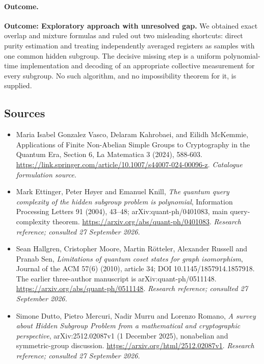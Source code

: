\documentclass[11pt,a4paper]{article}
\numberwithin{equation}{section}
\begin{document}
\paragraph{Outcome.}
\textbf{Outcome: Exploratory approach with unresolved gap.}
We obtained exact overlap and mixture formulas and ruled out two misleading shortcuts: direct purity estimation and treating independently averaged registers as samples with one common hidden subgroup. The decisive missing step is a uniform polynomial-time implementation and decoding of an appropriate collective measurement for every subgroup. No such algorithm, and no impossibility theorem for it, is supplied.

\subsection{Sources}
\begin{itemize}\raggedright
\item[\textnormal{[S1]}]\hypertarget{source:30006778:1}{} Maria Isabel Gonzalez Vasco, Delaram Kahrobaei, and Eilidh McKemmie, Applications of Finite Non-Abelian Simple Groups to Cryptography in the Quantum Era, Section 6, La Matematica 3 (2024), 588-603.
\url{https://link.springer.com/article/10.1007/s44007-024-00096-z}.
{\small\textit{Catalogue formulation source.}}
\item[\textnormal{[E1]}]\hypertarget{extra:30006778:1}{} Mark Ettinger, Peter H\o yer and Emanuel Knill, \emph{The quantum query complexity of the hidden subgroup problem is polynomial}, Information Processing Letters 91 (2004), 43--48; arXiv:quant-ph/0401083, main query-complexity theorem.
\url{https://arxiv.org/abs/quant-ph/0401083}.
{\small\textit{Research reference; consulted 27 September 2026.}}
\item[\textnormal{[E2]}]\hypertarget{extra:30006778:2}{} Sean Hallgren, Cristopher Moore, Martin R\"otteler, Alexander Russell and Pranab Sen, \emph{Limitations of quantum coset states for graph isomorphism}, Journal of the ACM 57(6) (2010), article 34; DOI 10.1145/1857914.1857918. The earlier three-author manuscript is arXiv:quant-ph/0511148.
\url{https://arxiv.org/abs/quant-ph/0511148}.
{\small\textit{Research reference; consulted 27 September 2026.}}
\item[\textnormal{[E3]}]\hypertarget{extra:30006778:3}{} Simone Dutto, Pietro Mercuri, Nadir Murru and Lorenzo Romano, \emph{A survey about Hidden Subgroup Problem from a mathematical and cryptographic perspective}, arXiv:2512.02087v1 (1 December 2025), nonabelian and symmetric-group discussion.
\url{https://arxiv.org/html/2512.02087v1}.
{\small\textit{Research reference; consulted 27 September 2026.}}
\end{itemize}
\end{document}
